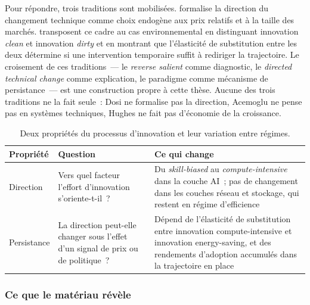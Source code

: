 Pour répondre, trois traditions sont mobilisées.  \textcite{acemoglu_directed_2002} formalise la direction du changement technique comme choix endogène aux prix relatifs et à la taille des marchés. \textcite{acemoglu_environment_2012} transposent ce cadre au cas environnemental en distinguant innovation \emph{clean} et innovation \emph{dirty} et en montrant que l'élasticité de substitution entre les deux détermine si une intervention temporaire suffit à rediriger la trajectoire.  Le croisement de ces traditions~--- le \emph{reverse salient} comme diagnostic, le \emph{directed technical change} comme explication, le paradigme comme mécanisme de persistance~--- est une construction propre à cette thèse. Aucune des trois traditions ne la fait seule~: Dosi ne formalise pas la direction, Acemoglu ne pense pas en systèmes techniques, Hughes ne fait pas d'économie de la croissance.


\begin{table}[!ht]
\caption{Deux propriétés du processus d'innovation et leur variation entre régimes.}\label{tab:d10-proprietes}
\centering\footnotesize
\renewcommand{\arraystretch}{1.25}
\begin{tabularx}{\textwidth}{@{}p{2.2cm}p{4.0cm}X@{}}
\toprule
\textbf{Propriété} & \textbf{Question} & \textbf{Ce qui change} \\
\midrule
Direction & Vers quel facteur l'effort d'innovation s'oriente-t-il~? & Du \emph{skill-biased} au \emph{compute-intensive} dans la couche AI~; pas de changement dans les couches réseau et stockage, qui restent en régime d'efficience \\
Persistance & La direction peut-elle changer sous l'effet d'un signal de prix ou de politique~? & Dépend de l'élasticité de substitution entre innovation compute-intensive et innovation energy-saving, et des rendements d'adoption accumulés dans la trajectoire en place \\
\bottomrule
\end{tabularx}
\renewcommand{\arraystretch}{1.0}
\end{table}


\subsubsection{Ce que le matériau révèle}

